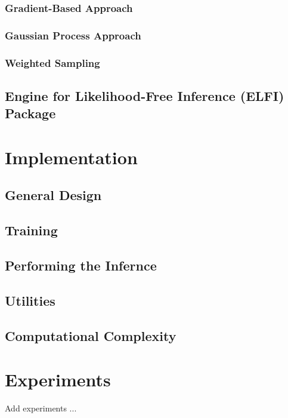 \documentclass[11pt,twoside]{article}
\numberwithin{Theorem}{section}
\numberwithin{Definition}{section}
\numberwithin{Lemma}{section}
\numberwithin{Algorithm}{section}
\numberwithin{equation}{section}
\begin{document}
\subsubsection{Gradient-Based Approach}

\subsubsection{Gaussian Process Approach}

\subsubsection{Weighted Sampling}

\subsection{Engine for Likelihood-Free Inference (ELFI) Package}
\clearpage


\section{Implementation}

\subsection{General Design}

\subsection{Training}

\subsection{Performing the Infernce}

\subsection{Utilities}

\subsection{Computational Complexity}

\clearpage
\section{Experiments}
Add experiments ...
\end{document}
